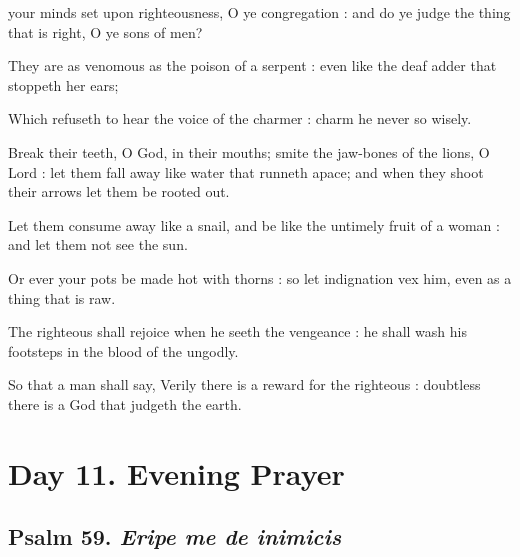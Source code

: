  your minds set upon righteousness, O ye congregation : and do ye judge the thing that is right, O ye sons of men?\par
{}
They are as venomous as the poison of a serpent : even like the deaf adder that stoppeth her ears;\par
{}Which refuseth to hear the voice of the charmer : charm he never so wisely.\par
{}Break their teeth, O God, in their mouths; smite the jaw-bones of the lions, O Lord : let them fall away like water that runneth apace; and when they shoot their arrows let them be rooted out.\par
{}Let them consume away like a snail, and be like the untimely fruit of a woman : and let them not see the sun.\par
{}Or ever your pots be made hot with thorns : so let indignation vex him, even as a thing that is raw.\par
{}The righteous shall rejoice when he seeth the vengeance : he shall wash his footsteps in the blood of the ungodly.\par
{}So that a man shall say, Verily there is a reward for the righteous : doubtless there is a God that judgeth the earth.\par

\section*{Day 11. Evening Prayer}

\subsection{Psalm 59. \textit{Eripe me de inimicis}}

